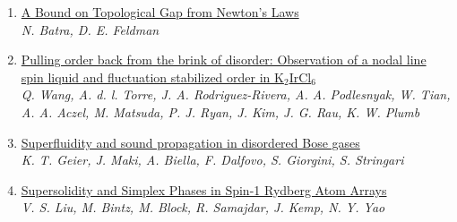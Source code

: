 \documentclass{article}
\begin{document}
\begin{enumerate}
\item\href{http://arxiv.org/abs/2407.17603v1}{\textsf{A Bound on Topological Gap from Newton's Laws}}\\
{\small\color{blue}\textsl{N. Batra, D. E. Feldman}}
\item\href{http://arxiv.org/abs/2407.17559v1}{\textsf{Pulling order back from the brink of disorder: Observation of a nodal
  line spin liquid and fluctuation stabilized order in K$_2$IrCl$_6$}}\\
{\small\color{blue}\textsl{Q. Wang, A. d. l. Torre, J. A. Rodriguez-Rivera, A. A. Podlesnyak, W. Tian, A. A. Aczel, M. Matsuda, P. J. Ryan, J. Kim, J. G. Rau, K. W. Plumb}}
\item\href{http://arxiv.org/abs/2407.17558v1}{\textsf{Superfluidity and sound propagation in disordered Bose gases}}\\
{\small\color{blue}\textsl{K. T. Geier, J. Maki, A. Biella, F. Dalfovo, S. Giorgini, S. Stringari}}
\item\href{http://arxiv.org/abs/2407.17554v1}{\textsf{Supersolidity and Simplex Phases in Spin-1 Rydberg Atom Arrays}}\\
{\small\color{blue}\textsl{V. S. Liu, M. Bintz, M. Block, R. Samajdar, J. Kemp, N. Y. Yao}}
\end{enumerate}
\end{document}
